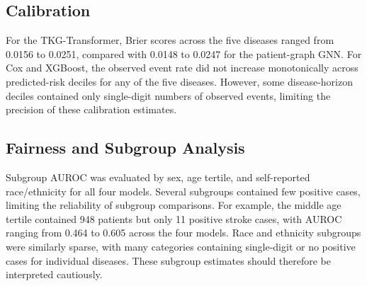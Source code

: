 \subsection{Calibration}
\label{sec:results-calibration}

For the TKG-Transformer, Brier scores across the five diseases ranged from 0.0156 to 0.0251, compared with 0.0148 to 0.0247 for the patient-graph GNN. For Cox and XGBoost, the observed event rate did not increase monotonically across predicted-risk deciles for any of the five diseases. However, some disease-horizon deciles contained only single-digit numbers of observed events, limiting the precision of these calibration estimates.

\subsection{Fairness and Subgroup Analysis}
\label{sec:results-fairness}

Subgroup AUROC was evaluated by sex, age tertile, and self-reported race/ethnicity for all four models. Several subgroups contained few positive cases, limiting the reliability of subgroup comparisons. For example, the middle age tertile contained 948 patients but only 11 positive stroke cases, with AUROC ranging from 0.464 to 0.605 across the four models. Race and ethnicity subgroups were similarly sparse, with many categories containing single-digit or no positive cases for individual diseases. These subgroup estimates should therefore be interpreted cautiously.
